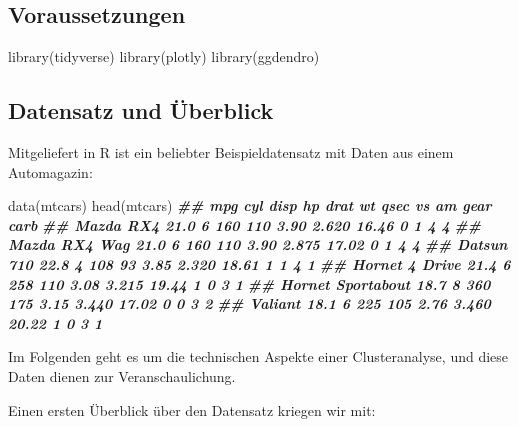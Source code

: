 \documentclass[
  ngerman,
]{article}
\newenvironment{Shaded}{\begin{snugshade}}{\end{snugshade}}
\newcommand{\DocumentationTok}[1]{\textcolor[rgb]{0.56,0.35,0.01}{\textbf{\textit{#1}}}}
\newcommand{\FunctionTok}[1]{\textcolor[rgb]{0.00,0.00,0.00}{#1}}
\newcommand{\NormalTok}[1]{#1}
\begin{document}
\hypertarget{voraussetzungen-2}{%
\subsection{Voraussetzungen}\label{voraussetzungen-2}}

\begin{Shaded}
\begin{Highlighting}[]
\FunctionTok{library}\NormalTok{(tidyverse)}
\FunctionTok{library}\NormalTok{(plotly)}
\FunctionTok{library}\NormalTok{(ggdendro)}
\end{Highlighting}
\end{Shaded}

\hypertarget{datensatz-und-uxfcberblick}{%
\subsection{Datensatz und Überblick}\label{datensatz-und-uxfcberblick}}

Mitgeliefert in R ist ein beliebter Beispieldatensatz mit Daten aus einem Automagazin:

\begin{Shaded}
\begin{Highlighting}[]
\FunctionTok{data}\NormalTok{(mtcars)}
\FunctionTok{head}\NormalTok{(mtcars)}
\DocumentationTok{\#\#                    mpg cyl disp  hp drat    wt  qsec vs am gear carb}
\DocumentationTok{\#\# Mazda RX4         21.0   6  160 110 3.90 2.620 16.46  0  1    4    4}
\DocumentationTok{\#\# Mazda RX4 Wag     21.0   6  160 110 3.90 2.875 17.02  0  1    4    4}
\DocumentationTok{\#\# Datsun 710        22.8   4  108  93 3.85 2.320 18.61  1  1    4    1}
\DocumentationTok{\#\# Hornet 4 Drive    21.4   6  258 110 3.08 3.215 19.44  1  0    3    1}
\DocumentationTok{\#\# Hornet Sportabout 18.7   8  360 175 3.15 3.440 17.02  0  0    3    2}
\DocumentationTok{\#\# Valiant           18.1   6  225 105 2.76 3.460 20.22  1  0    3    1}
\end{Highlighting}
\end{Shaded}

Im Folgenden geht es um die technischen Aspekte einer Clusteranalyse, und diese Daten dienen zur Veranschaulichung.

Einen ersten Überblick über den Datensatz kriegen wir mit:
\end{document}
